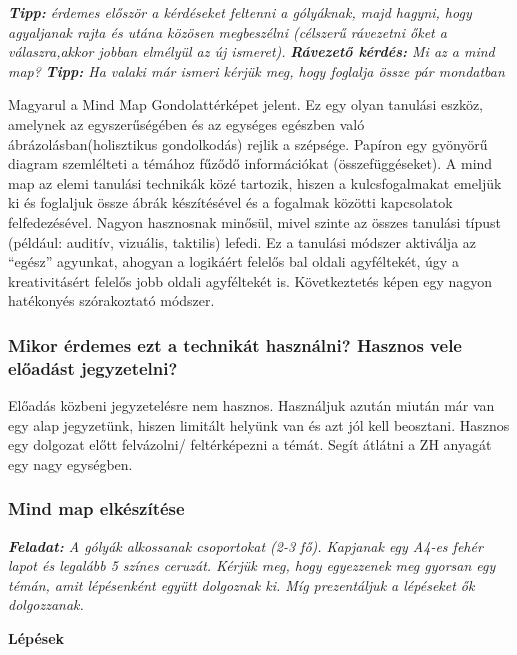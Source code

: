 \documentclass[../Main.tex]{subfiles}
\begin{document}
\textit{\textbf{Tipp:} érdemes először a kérdéseket feltenni a gólyáknak, majd hagyni,
 hogy agyaljanak rajta és utána közösen megbeszélni 
(célszerű rávezetni őket a válaszra,akkor jobban elmélyül az új ismeret).} \newline
 \textit{\textbf{Rávezető kérdés:} Mi az a mind map?} \newline
\textit{\textbf{Tipp:} Ha valaki már ismeri kérjük meg, hogy foglalja össze pár mondatban}

Magyarul a Mind Map Gondolattérképet jelent. Ez egy olyan tanulási eszköz, amelynek az egyszerűségében és
az egységes egészben való ábrázolásban(holisztikus gondolkodás) rejlik a szépsége. Papíron egy gyönyörű
diagram szemlélteti a témához fűződő információkat (összefüggéseket).
A mind map az elemi tanulási technikák közé tartozik, hiszen a kulcsfogalmakat emeljük ki
és foglaljuk össze ábrák készítésével és a fogalmak közötti kapcsolatok felfedezésével.
Nagyon hasznosnak minősül, mivel szinte az összes tanulási típust (például: auditív, vizuális, taktilis) lefedi.
Ez a tanulási módszer aktiválja az “egész” agyunkat, ahogyan a logikáért felelős bal oldali agyféltekét,
úgy a kreativitásért felelős jobb oldali agyféltekét is. Következtetés képen egy nagyon hatékonyés szórakoztató módszer.

\subsubsection{Mikor érdemes ezt a technikát használni? \newline Hasznos vele előadást jegyzetelni?}

Előadás közbeni jegyzetelésre nem hasznos.
Használjuk azután miután már van egy alap jegyzetünk, hiszen limitált helyünk van és azt jól kell beosztani.
    Hasznos egy dolgozat előtt felvázolni/ feltérképezni a témát. Segít átlátni a ZH anyagát egy nagy egységben.

\subsubsection{Mind map elkészítése}

\textit{\textbf{Feladat:} A gólyák alkossanak csoportokat (2-3 fő).
Kapjanak egy A4-es fehér lapot és legalább 5 színes ceruzát.
Kérjük meg, hogy egyezzenek meg gyorsan egy témán, amit lépésenként együtt dolgoznak ki.
Míg prezentáljuk a lépéseket ők dolgozzanak.}


\textbf{Lépések}
\end{document}
